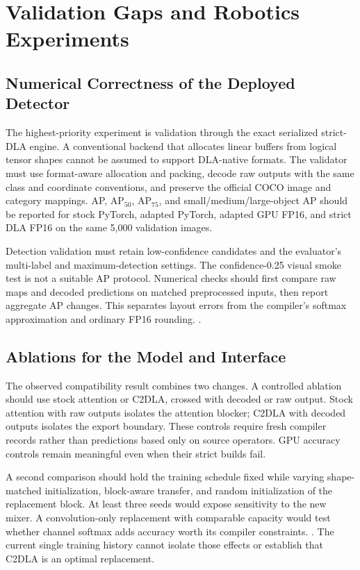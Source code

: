 \section{Validation Gaps and Robotics Experiments}
\label{sec:discussion}
\subsection{Numerical Correctness of the Deployed Detector}
The highest-priority experiment is validation through the exact serialized
strict-DLA engine. A conventional backend that allocates linear buffers from
logical tensor shapes cannot be assumed to support DLA-native formats. The
validator must use format-aware allocation and packing, decode raw outputs with
the same class and coordinate conventions, and preserve the official COCO image
and category mappings. AP, AP$_{50}$, AP$_{75}$, and small/medium/large-object
AP should be reported for stock PyTorch, adapted PyTorch, adapted GPU FP16,
and strict DLA FP16 on the same 5,000 validation images.

Detection validation must retain low-confidence candidates and the evaluator's
multi-label and maximum-detection settings. The confidence-0.25 visual smoke
test is not a suitable AP protocol. Numerical checks should first compare raw
maps and decoded predictions on matched preprocessed inputs, then report
aggregate AP changes. This separates layout errors from the compiler's softmax
approximation and ordinary FP16 rounding.
.

\subsection{Ablations for the Model and Interface}
The observed compatibility result combines two changes. A controlled ablation
should use stock attention or C2DLA, crossed with decoded or raw output. Stock
attention with raw outputs isolates the attention blocker; C2DLA with decoded
outputs isolates the export boundary. These controls require fresh compiler
records rather than predictions based only on source operators. GPU accuracy
controls remain meaningful even when their strict builds fail.

A second comparison should hold the training schedule fixed while varying
shape-matched initialization, block-aware transfer, and random initialization
of the replacement block. At least three seeds would expose sensitivity to the
new mixer. A convolution-only replacement with comparable capacity would test
whether channel softmax adds accuracy worth its compiler constraints.
.
The current single training history cannot isolate those effects or establish
that C2DLA is an optimal replacement.

